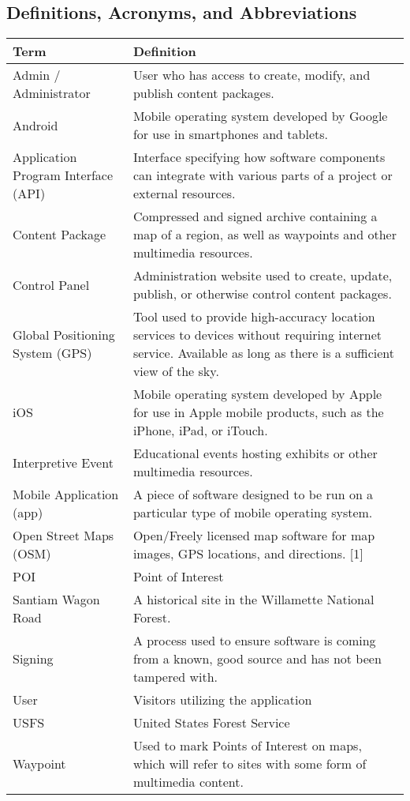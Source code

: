 \documentclass[letterpaper,10pt,titlepage]{article}
\begin{document}
\subsection{Definitions, Acronyms, and Abbreviations }
\begin{table}[ht]
\begin{tabular}{| l | p{9cm} |}
\hline
\textbf{Term} & \textbf{Definition} \\ \hline
Admin / Administrator & User who has access to create, modify, and publish content packages. \\ \hline
Android & Mobile operating system developed by Google for use in smartphones and tablets. \\ \hline
Application Program Interface (API) & Interface specifying how software components can integrate with various parts of a project or external resources. \\ \hline
Content Package & Compressed and signed archive containing a map of a region, as well as waypoints and other multimedia resources. \\ \hline
Control Panel & Administration website used to create, update, publish, or otherwise control content packages. \\ \hline
Global Positioning System (GPS) & Tool used to provide high-accuracy location services to devices without requiring internet service. Available as long as there is a sufficient view of the sky. \\ \hline
iOS & Mobile operating system developed by Apple for use in Apple mobile products, such as the iPhone, iPad, or iTouch. \\ \hline
Interpretive Event & Educational events hosting exhibits or other multimedia resources. \\ \hline
Mobile Application (app) & A piece of software designed to be run on a particular type of mobile operating system. \\ \hline
Open Street Maps (OSM) & Open/Freely licensed map software for map images, GPS locations, and directions. {[}1{]} \\ \hline
POI & Point of Interest \\ \hline
Santiam Wagon Road & A historical site in the Willamette National Forest. \\ \hline
Signing & A process used to ensure software is coming from a known, good source and has not been tampered with. \\ \hline
User & Visitors utilizing the application \\ \hline
USFS & United States Forest Service \\ \hline
Waypoint & Used to mark Points of Interest on maps, which will refer to sites with some form of multimedia content. \\ \hline
\end{tabular}
\end{table}                                                
\end{document}

